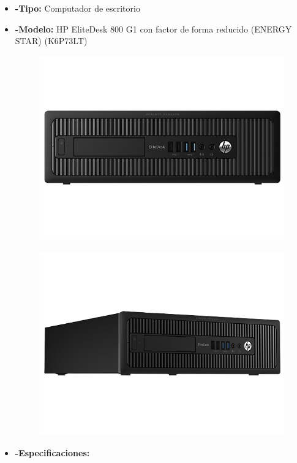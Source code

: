 \documentclass{udpreport}
\begin{document}
\begin{itemize}
		\item{\bf-Tipo:} Computador de escritorio\\
		\item{\bf-Modelo:}  HP EliteDesk 800 G1 con factor de forma reducido (ENERGY STAR)
		(K6P73LT)\\
		\begin{figure}[h]
    		\centering
    	\includegraphics[width=\textwidth]{pchp1.png}
		\end{figure}
		\begin{figure}[h]
    		\centering
    	\includegraphics[width=\textwidth]{pchp2.png}
		\end{figure}
		\item{\bf-Especificaciones:}

\end{itemize}
\end{document}
